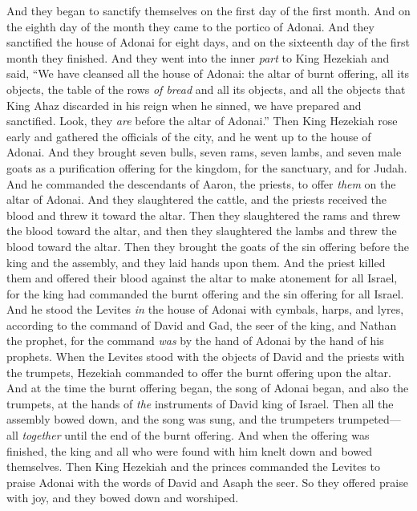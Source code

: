 \begin{biblechapter}
\verse And they began to sanctify themselves on the first day of the first month. And on the eighth day of the month they came to the portico of Adonai. And they sanctified the house of Adonai for eight days, and on the sixteenth day of the first month they finished.
\verse And they went into the inner \textit{part} to King Hezekiah and said, “We have cleansed all the house of Adonai: the altar of burnt offering, all its objects, the table of the rows \textit{of bread} and all its objects,
\verse and all the objects that King Ahaz discarded in his reign when he sinned, we have prepared and sanctified. Look, they \textit{are} before the altar of Adonai.”
\verse Then King Hezekiah rose early and gathered the officials of the city, and he went up to the house of Adonai.
\verse And they brought seven bulls, seven rams, seven lambs, and seven male goats as a purification offering for the kingdom, for the sanctuary, and for Judah. And he commanded the descendants of Aaron, the priests, to offer \textit{them} on the altar of Adonai.
\verse And they slaughtered the cattle, and the priests received the blood and threw it toward the altar. Then they slaughtered the rams and threw the blood toward the altar, and then they slaughtered the lambs and threw the blood toward the altar.
\verse Then they brought the goats of the sin offering before the king and the assembly, and they laid hands upon them.
\verse And the priest killed them and offered their blood against the altar to make atonement for all Israel, for the king had commanded the burnt offering and the sin offering for all Israel.
\verse And he stood the Levites \textit{in} the house of Adonai with cymbals, harps, and lyres, according to the command of David and Gad, the seer of the king, and Nathan the prophet, for the command \textit{was} by the hand of Adonai by the hand of his prophets.
\verse When the Levites stood with the objects of David and the priests with the trumpets,
\verse Hezekiah commanded to offer the burnt offering upon the altar. And at the time the burnt offering began, the song of Adonai began, and also the trumpets, at the hands of \textit{the} instruments of David king of Israel.
\verse Then all the assembly bowed down, and the song was sung, and the trumpeters trumpeted—all \textit{together} until the end of the burnt offering.
\verse And when the offering was finished, the king and all who were found with him knelt down and bowed themselves.
\verse Then King Hezekiah and the princes commanded the Levites to praise Adonai with the words of David and Asaph the seer. So they offered praise with joy, and they bowed down and worshiped.

\end{biblechapter}
